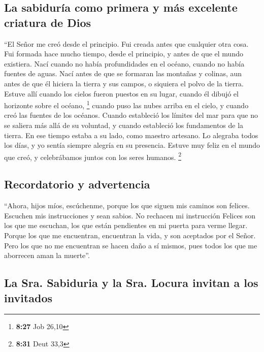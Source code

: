 \hypertarget{la-sabiduruxeda-como-primera-y-muxe1s-excelente-criatura-de-dios}{%
\subsection{La sabiduría como primera y más excelente criatura de
Dios}\label{la-sabiduruxeda-como-primera-y-muxe1s-excelente-criatura-de-dios}}

 ``El Señor me creó desde el principio. Fui creada antes
que cualquier otra cosa.  Fui formada hace mucho tiempo,
desde el principio, y antes de que el mundo existiera. 
Nací cuando no había profundidades en el océano, cuando no había fuentes
de aguas.  Nací antes de que se formaran las montañas y
colinas,  aun antes de que él hiciera la tierra y sus
campos, o siquiera el polvo de la tierra.  Estuve allí
cuando los cielos fueron puestos en su lugar, cuando él dibujó el
horizonte sobre el océano, \footnote{\textbf{8:27} Job 26,10}
 cuando puso las nubes arriba en el cielo, y cuando creó
las fuentes de los océanos.  Cuando estableció los
límites del mar para que no se saliera más allá de su voluntad, y cuando
estableció los fundamentos de la tierra.  En ese tiempo
estaba a su lado, como maestro artesano. Lo alegraba todos los días, y
yo sentía siempre alegría en su presencia.  Estuve muy
feliz en el mundo que creó, y celebrábamos juntos con los seres humanos.
\footnote{\textbf{8:31} Deut 33,3}

\hypertarget{recordatorio-y-advertencia}{%
\subsection{Recordatorio y
advertencia}\label{recordatorio-y-advertencia}}

 ``Ahora, hijos míos, escúchenme, porque los que siguen
mis caminos son felices.  Escuchen mis instrucciones y
sean sabios. No rechacen mi instrucción  Felices son los
que me escuchan, los que están pendientes en mi puerta para verme
llegar.  Porque los que me encuentran, encuentran la
vida, y son aceptados por el Señor.  Pero los que no me
encuentran se hacen daño a sí mismos, pues todos los que me aborrecen
aman la muerte''.

\hypertarget{la-sra.-sabiduria-y-la-sra.-locura-invitan-a-los-invitados}{%
\subsection{La Sra. Sabiduria y la Sra. Locura invitan a los
invitados}\label{la-sra.-sabiduria-y-la-sra.-locura-invitan-a-los-invitados}}

